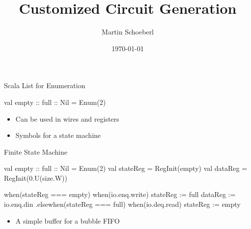 


\newif\ifbook



\title{Customized Circuit Generation}
\author{Martin Schoeberl}
\date{\today}



\begin{frame}
\titlepage
\end{frame}





\begin{frame}[fragile]{Scala List for Enumeration}
\begin{chisel}
  val empty :: full :: Nil = Enum(2)
\end{chisel}
\begin{itemize}
\item Can be used in wires and registers
\item Symbols for a state machine
\end{itemize}
\end{frame}

\begin{frame}[fragile]{Finite State Machine}
\begin{chisel}
  val empty :: full :: Nil = Enum(2)
  val stateReg = RegInit(empty)
  val dataReg = RegInit(0.U(size.W))

  when(stateReg === empty) {
    when(io.enq.write) {
      stateReg := full
      dataReg := io.enq.din
    }
  }.elsewhen(stateReg === full) {
    when(io.deq.read) {
      stateReg := empty
    }
  }
\end{chisel}
\begin{itemize}
\item A simple buffer for a bubble FIFO
\end{itemize}
\end{frame}

